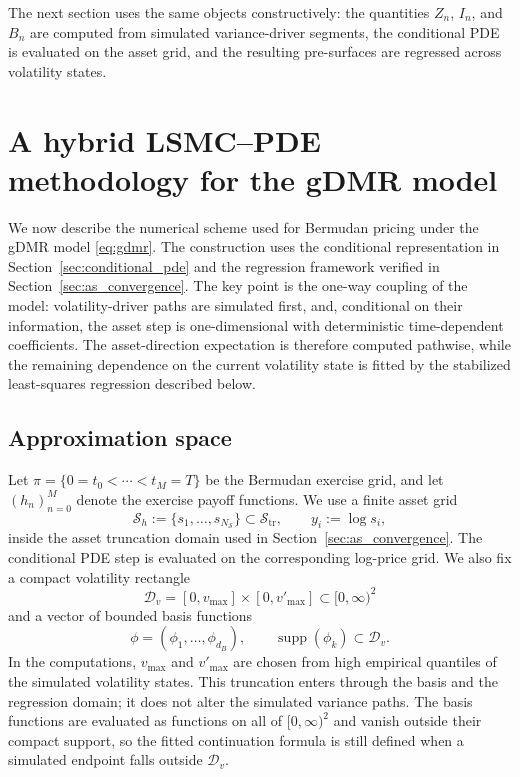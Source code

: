 \documentclass[pdflatex,sn-mathphys-num]{sn-jnl}
\theoremstyle{thmstyleone}%
\theoremstyle{thmstylethree}%
\theoremstyle{thmstyletwo}%
\providecommand{\supp}{\operatorname{supp}}
\begin{document}
The next section uses the same objects constructively: the quantities $Z_n$, $I_n$, and $B_n$ are computed from
simulated variance-driver segments, the conditional PDE is evaluated on the asset grid, and the resulting
pre-surfaces are regressed across volatility states.




\section{A hybrid LSMC--PDE methodology for the gDMR model}
\label{sec:hybrid-method}

We now describe the numerical scheme used for Bermudan pricing under the gDMR model \eqref{eq:gdmr}. The construction uses the conditional representation in Section~\ref{sec:conditional_pde} and the regression framework verified in Section~\ref{sec:as_convergence}. The key point is the one-way coupling of the model: volatility-driver paths are simulated first, and, conditional on their information, the asset step is one-dimensional with deterministic time-dependent coefficients. The asset-direction expectation is therefore computed pathwise, while the remaining dependence on the current volatility state is fitted by the stabilized least-squares regression described below.

\subsection{Approximation space}
Let $\pi=\{0=t_0<\cdots<t_M=T\}$ be the Bermudan exercise grid, and let $(h_n)_{n=0}^M$ denote the exercise payoff functions. We use a finite asset grid
\[
\mathcal S_h := \{s_1,\dots,s_{N_{\mathcal S}}\}\subset \mathcal S_{\mathrm{tr}},
\qquad y_i:=\log s_i,
\]
inside the asset truncation domain used in Section~\ref{sec:as_convergence}. The conditional PDE step is evaluated on the corresponding log-price grid. We also fix a compact volatility rectangle
\[
\mathcal D_v=[0,v_{\max}]\times[0,v'_{\max}]\subset[0,\infty)^2
\]
and a vector of bounded basis functions
\[
\phi=(\phi_1,\dots,\phi_{d_B}),\qquad \supp(\phi_k)\subset \mathcal D_v.
\]
In the computations, $v_{\max}$ and $v'_{\max}$ are chosen from high empirical quantiles of the simulated volatility states. This truncation enters through the basis and the regression domain; it does not alter the simulated variance paths. The basis functions are evaluated as functions on all of $[0,\infty)^2$ and vanish outside their compact support, so the fitted continuation formula is still defined when a simulated endpoint falls outside $\mathcal D_v$.
\end{document}
